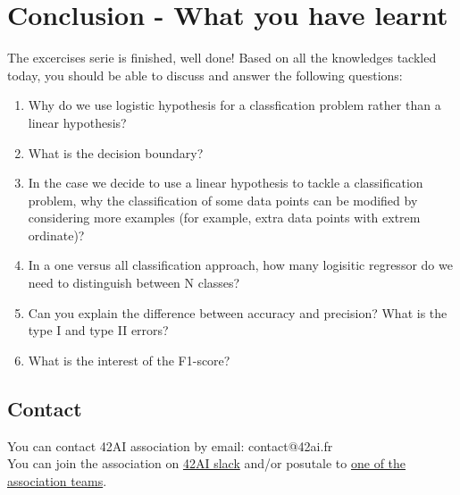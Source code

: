 \documentclass{42-en}
\begin{document}


\newpage

\chapter{Conclusion - What you have learnt}

The excercises serie is finished, well done!
Based on all the knowledges tackled today, you should be able to discuss and answer the following questions:

\begin{enumerate}
  \item Why do we use logistic hypothesis for a classfication problem rather than a linear hypothesis?
  \item What is the decision boundary?
  \item In the case we decide to use a linear hypothesis to tackle a classification problem, why the classification of some data points can be modified by considering more examples (for example, extra data points with extrem ordinate)?
  \item In a one versus all classification approach, how many logisitic regressor do we need to distinguish between N classes?
  \item Can you explain the difference between accuracy and precision? What is the type I and type II errors?
  \item What is the interest of the F1-score?
\end{enumerate}


\newpage

\section*{Contact}
You can contact 42AI association by email: contact@42ai.fr\\
You can join the association on \href{https://join.slack.com/t/42-ai/shared_invite/zt-ebccw5r7-YPkDM6xOiYRPjqJXkrKgcA}{42AI slack}
and/or posutale to \href{https://forms.gle/VAFuREWaLmaqZw2D8}{one of the association teams}.
\end{document}
